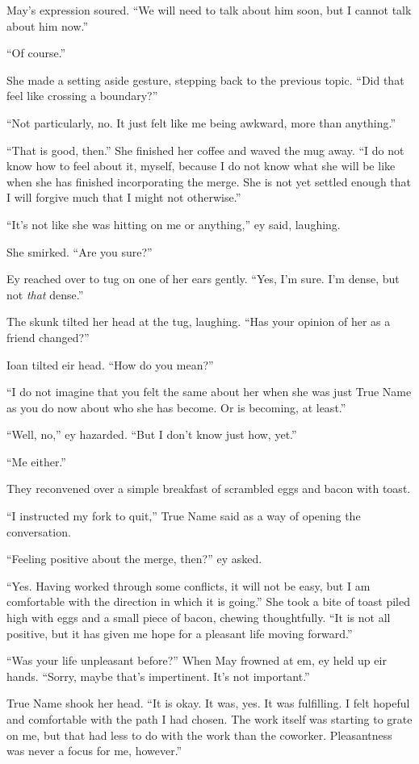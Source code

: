 May's expression soured. ``We will need to talk about him soon, but I cannot talk about him now.''

``Of course.''

She made a setting aside gesture, stepping back to the previous topic. ``Did that feel like crossing a boundary?''

``Not particularly, no. It just felt like me being awkward, more than anything.''

``That is good, then.'' She finished her coffee and waved the mug away. ``I do not know how to feel about it, myself, because I do not know what she will be like when she has finished incorporating the merge. She is not yet settled enough that I will forgive much that I might not otherwise.''

``It's not like she was hitting on me or anything,'' ey said, laughing.

She smirked. ``Are you sure?''

Ey reached over to tug on one of her ears gently. ``Yes, I'm sure. I'm dense, but not \emph{that} dense.''

The skunk tilted her head at the tug, laughing. ``Has your opinion of her as a friend changed?''

Ioan tilted eir head. ``How do you mean?''

``I do not imagine that you felt the same about her when she was just True Name as you do now about who she has become. Or is becoming, at least.''

``Well, no,'' ey hazarded. ``But I don't know just how, yet.''

``Me either.''

They reconvened over a simple breakfast of scrambled eggs and bacon with toast.

``I instructed my fork to quit,'' True Name said as a way of opening the conversation.

``Feeling positive about the merge, then?'' ey asked.

``Yes. Having worked through some conflicts, it will not be easy, but I am comfortable with the direction in which it is going.'' She took a bite of toast piled high with eggs and a small piece of bacon, chewing thoughtfully. ``It is not all positive, but it has given me hope for a pleasant life moving forward.''

``Was your life unpleasant before?'' When May frowned at em, ey held up eir hands. ``Sorry, maybe that's impertinent. It's not important.''

True Name shook her head. ``It is okay. It was, yes. It was fulfilling. I felt hopeful and comfortable with the path I had chosen. The work itself was starting to grate on me, but that had less to do with the work than the coworker. Pleasantness was never a focus for me, however.''

